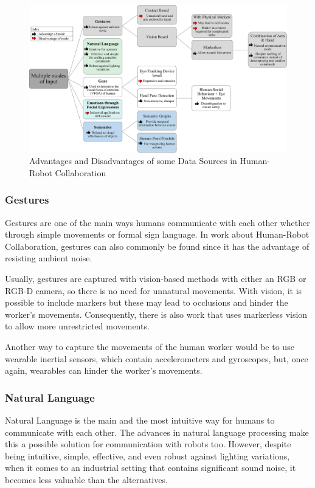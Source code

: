 \begin{figure}[H]
\centerline{\includegraphics[width=6in]{figs/interaction.PNG}}
\caption{Advantages and Disadvantages of some Data Sources in Human-Robot Collaboration \cite{Mukherjee2022}}
\label{interaction}
\end{figure}

\subsubsection{Gestures}

Gestures are one of the main ways humans communicate with each other whether through simple movements or formal sign language. In work about Human-Robot Collaboration, gestures can also commonly be found since it has the advantage of resisting ambient noise.

Usually, gestures are captured with vision-based methods with either an RGB or RGB-D camera, so there is no need for unnatural movements. With vision, it is possible to include markers but these may lead to occlusions and hinder the worker's movements. Consequently, there is also work that uses markerless vision to allow more unrestricted movements.

Another way to capture the movements of the human worker would be to use wearable inertial sensors, which contain accelerometers and gyroscopes, but, once again, wearables can hinder the worker's movements.

\subsubsection{Natural Language}

Natural Language is the main and the most intuitive way for humans to communicate with each other. The advances in natural language processing make this a possible solution for communication with robots too. However, despite being intuitive, simple, effective, and even robust against lighting variations, when it comes to an industrial setting that contains significant sound noise, it becomes less valuable than the alternatives.


